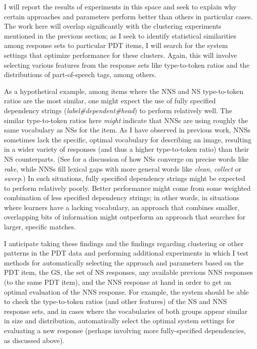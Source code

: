 I will report the results of experiments in this space and seek to explain why certain approaches and parameters perform better than others in particular cases.
The work here will overlap significantly with the clustering experiments mentioned in the previous section; as I seek to identify statistical similarities among response sets to particular PDT items, I will search for the system settings that optimize performance for these clusters. Again, this will involve selecting various features from the response sets like type-to-token ratios and the distributions of part-of-speech tags, among others.
\par
As a hypothetical example, among items where the NNS and NS type-to-token ratios are the most similar, one might expect the use of fully specified dependency strings (\textit{label\#dependent\#head}) to perform relatively well. The similar type-to-token ratios here \textit{might} indicate that NNSs are using roughly the same vocabulary as NSs for the item. As I have observed in previous work, NNSs sometimes lack the specific, optimal vocabulary for describing an image, resulting in a wider variety of responses (and thus a higher type-to-token ratio) than their NS counterparts. (See \citet{king:dickinson:13} for a discussion of how NSs converge on precise words like \textit{rake}, while NNSs fill lexical gaps with more general words like \textit{clean}, \textit{collect} or \textit{sweep}.) In such situations, fully specified dependency strings might be expected to perform relatively poorly. Better performance might come from some weighted combination of less specified dependency strings; in other words, in situations where learners have a lacking vocabulary, an approach that combines smaller, overlapping bits of information might outperform an approach that searches for larger, specific matches. 
\par
I anticipate taking these findings and the findings regarding clustering or other patterns in the PDT data and performing additional experiments in which I test methods for automatically selecting the approach and parameters based on the PDT item, the GS, the set of NS responses, any available previous NNS responses (to the same PDT item), and the NNS response at hand in order to get an optimal evaluation of the NNS response. For example, the system should be able to check the type-to-token ratios (and other features) of the NS and NNS response sets, and in cases where the vocabularies of both groups appear similar in size and distribution, automatically select the optimal system settings for evaluating a new response (perhaps involving more fully-specified dependencies, as discussed above).
